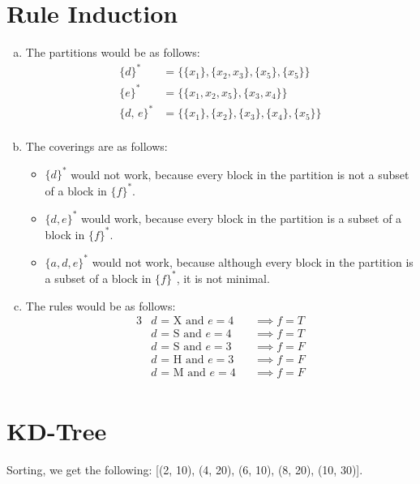 \documentclass[12pt]{scrartcl}
\begin{document}
\section{Rule Induction}
\begin{enumerate}[(a)]
    \item The partitions would be as follows:
        \begin{align*}
            {\{d\}}^*      & = \{ \{x_1\}, \{x_2, x_3\}, \{x_5\}, \{x_5\} \}     \\
            {\{e\}}^*      & = \{ \{x_1, x_2, x_5\}, \{x_3, x_4\} \}             \\
            {\{d,\, e\}}^* & = \{ \{x_1\}, \{x_2\}, \{x_3\}, \{x_4\}, \{x_5\} \} \\
        \end{align*}

    \item The coverings are as follows:
        \begin{itemize}
            \item ${\{d\}}^*$ would not work, because every block in the partition is not a subset of a block in ${\{f\}}^*$.
            \item ${\{d, e\}}^*$ would work, because every block in the partition is a subset of a block in ${\{f\}}^*$.
            \item ${\{a, d, e\}}^*$ would not work, because although every block in the partition is a subset of a block in ${\{f\}}^*$, it is not minimal.
        \end{itemize}

    \item The rules would be as follows:
        \begin{alignat*}{3}
            &\text{$d$ = X and $e = 4$}  &&\implies \text{$f = T$} \\
            &\text{$d$ = S and $e = 4$}  &&\implies \text{$f = T$} \\
            &\text{$d$ = S and $e = 3$}  &&\implies \text{$f = F$} \\
            &\text{$d$ = H and $e = 3$}  &&\implies \text{$f = F$} \\
            &\text{$d$ = M and $e = 4$}  &&\implies \text{$f = F$} \\
        \end{alignat*}
\end{enumerate}

\section{KD-Tree}
Sorting, we get the following: [(2, 10), (4, 20), (6, 10), (8, 20), (10, 30)].
\end{document}
